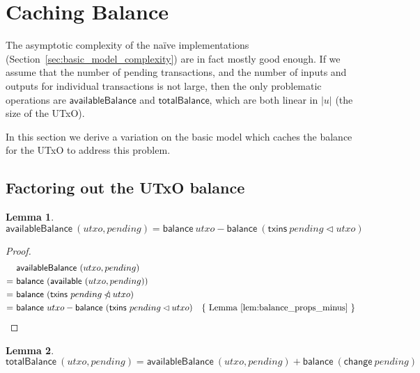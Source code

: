 \documentclass{article}
\newcommand{\restrictdom}{\lhd}
\newcommand{\subtractdom}{\mathbin{\slashed{\restrictdom}}}
\newtheorem{lemma}{Lemma}[section] %
\numberwithin{equation}{lemma}
\begin{document}
\section{Caching Balance}
\label{sec:caching_balance}

The asymptotic complexity of the na\"ive implementations
(Section~\ref{sec:basic_model_complexity}) are in fact mostly good enough. If we
assume that the number of pending transactions, and the number of inputs and
outputs for individual transactions is not large, then the only problematic
operations are $\mathsf{availableBalance}$ and $\mathsf{totalBalance}$, which
are both linear in $|u|$ (the size of the UTxO).

In this section we derive a variation on the basic model which caches the
balance for the UTxO to address this problem.


\subsection{Factoring out the UTxO balance}

\begin{lemma}
\begin{equation*}
  \mathsf{availableBalance} ~ (utxo, pending)
= \mathsf{balance} ~ utxo - \mathsf{balance} ~ (\mathsf{txins} ~ pending \restrictdom utxo)
\end{equation*}
\label{lem:availableBalance}
\end{lemma}

\begin{proof}
\begin{align*}
  & ~ \mathsf{availableBalance} ~ (utxo, pending) \\
= & ~ \mathsf{balance} ~ (\mathsf{available} ~ (utxo, pending)) \\
= & ~ \mathsf{balance} ~ (\mathsf{txins} ~ pending \subtractdom utxo) \\
= & ~ \mathsf{balance} ~ utxo - \mathsf{balance} ~ (\mathsf{txins} ~ pending \restrictdom utxo)
  & \text{\{ Lemma~\ref{lem:balance_props_minus} \}}
\end{align*}
\end{proof}

\begin{lemma}
\begin{equation*}
  \mathsf{totalBalance} ~ (utxo, pending)
= \mathsf{availableBalance} ~ (utxo, pending)
+ \mathsf{balance} ~ (\mathsf{change} ~ pending)
\end{equation*}
\label{lem:totalBalance}
\end{lemma}
\end{document}
